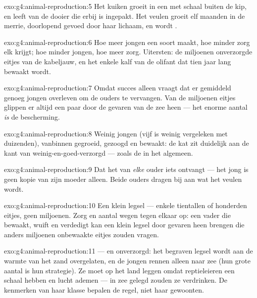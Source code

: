 \begin{solution}{exo:g4:animal-reproduction:5}
Het kuiken groeit in een  met schaal buiten de kip, en leeft van de
dooier die erbij is ingepakt. Het veulen groeit elf maanden in de
merrie, doorlopend gevoed door haar lichaam, en wordt .
\end{solution}

\begin{solution}{exo:g4:animal-reproduction:6}
Hoe meer jongen een soort maakt, hoe minder zorg elk krijgt; hoe minder
jongen, hoe meer zorg. Uitersten: de miljoenen onverzorgde eitjes van
de kabeljauw, en het enkele kalf van de olifant dat tien jaar lang
bewaakt wordt.
\end{solution}

\begin{solution}{exo:g4:animal-reproduction:7}
Omdat succes alleen vraagt dat er gemiddeld genoeg jongen overleven om
de ouders te vervangen. Van de miljoenen eitjes glippen er altijd een
paar door de gevaren van de zee heen --- het enorme aantal \emph{is} de
bescherming.
\end{solution}

\begin{solution}{exo:g4:animal-reproduction:8}
Weinig jongen (vijf is weinig vergeleken met duizenden), vanbinnen
gegroeid, gezoogd en bewaakt: de kat zit duidelijk aan de kant van
weinig-en-goed-verzorgd --- zoals de  in het algemeen.
\end{solution}

\begin{solution}{exo:g4:animal-reproduction:9}
Dat het van \emph{elke} ouder iets ontvangt --- het jong is geen kopie
van zijn moeder alleen. Beide ouders dragen bij aan wat het veulen wordt.
\end{solution}

\begin{solution}{exo:g4:animal-reproduction:10}
Een klein legsel --- enkele tientallen of honderden eitjes, geen
miljoenen. Zorg en aantal wegen tegen elkaar op: een vader die bewaakt,
wuift en verdedigt kan een klein legsel door gevaren heen brengen die
anders miljoenen onbewaakte eitjes zouden vragen.
\end{solution}

\begin{solution}{exo:g4:animal-reproduction:11}
 --- en onverzorgd: het begraven legsel wordt aan de warmte
van het zand overgelaten, en de jongen rennen alleen naar zee (hun
grote aantal is hun strategie). Ze moet op het land leggen omdat
reptieleieren een schaal hebben en lucht ademen --- in zee gelegd
zouden ze verdrinken. De kenmerken van haar klasse bepalen de regel,
niet haar gewoonten.
\end{solution}
